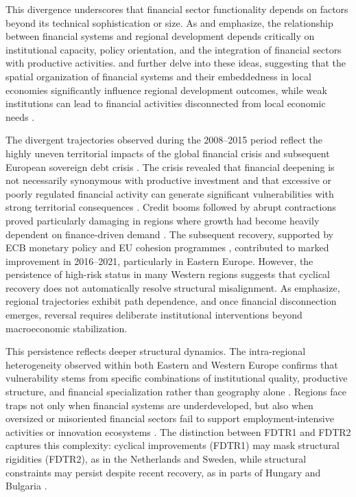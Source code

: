 \documentclass[a4paper,11pt,oneside]{article}
\begin{document}
This divergence underscores that financial sector functionality depends on factors beyond its technical sophistication or size. As \citet{dow1997regional} and \citet{rodriguez1998credit} emphasize, the relationship between financial systems and regional development depends critically on institutional capacity, policy orientation, and the integration of financial sectors with productive activities. \citet{klagge2005decentralized} and \citet{guiso2009does} further delve into these ideas, suggesting that the spatial organization of financial systems and their embeddedness in local economies significantly influence regional development outcomes, while weak institutions can lead to financial activities disconnected from local economic needs \citep{rodriguez2025banking}. 

The divergent trajectories observed during the 2008--2015 period reflect the highly uneven territorial impacts of the global financial crisis and subsequent European sovereign debt crisis \citep{lane2012european, moro2014lessons}. The crisis revealed that financial deepening is not necessarily synonymous with productive investment and that excessive or poorly regulated financial activity can generate significant vulnerabilities with strong territorial consequences \citep{gorton2010regulating, schularick2012credit, borio2014financial}. Credit booms followed by abrupt contractions proved particularly damaging in regions where growth had become heavily dependent on finance-driven demand \citep{benediktsdottir2011lessons, martin2011local}. The subsequent recovery, supported by ECB monetary policy \citep{acharya2019whatever} and EU cohesion programmes \citep{crescenzi2020one,di2022one}, contributed to marked improvement in 2016--2021, particularly in Eastern Europe. However, the persistence of high-risk status in many Western regions suggests that cyclical recovery does not automatically resolve structural misalignment. As \citet{martin2006path} emphasize, regional trajectories exhibit path dependence, and once financial disconnection emerges, reversal requires deliberate institutional interventions beyond macroeconomic stabilization.

This persistence reflects deeper structural dynamics. The intra-regional heterogeneity observed within both Eastern and Western Europe confirms that vulnerability stems from specific combinations of institutional quality, productive structure, and financial specialization rather than geography alone \citep{iammarino2019regional, diemer2022regional}. Regions face traps not only when financial systems are underdeveloped, but also when oversized or misoriented financial sectors fail to support employment-intensive activities or innovation ecosystems \citep{beck2007finance, crescenzi2016government}. The distinction between FDTR1 and FDTR2 captures this complexity: cyclical improvements (FDTR1) may mask structural rigidities (FDTR2), as in the Netherlands and Sweden, while structural constraints may persist despite recent recovery, as in parts of Hungary and Bulgaria \citep{gyHorffy2022middle, zuk2018real}.
\end{document}
